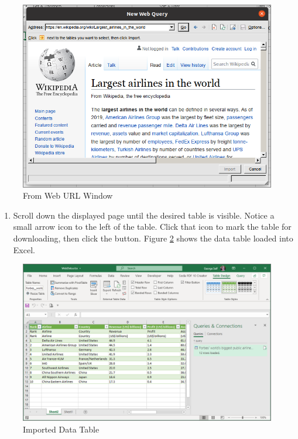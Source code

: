\begin{figure}[H]
	\centering
	\includegraphics[width=\maxwidth{.95\linewidth}]{gfx/ch07_fig02}
	\caption{From Web URL Window}
	\label{07:fig02}
\end{figure}



\begin{enumerate}[resume]
	\item Scroll down the displayed page until the desired table is visible. Notice a small arrow icon to the left of the table. Click that icon to mark the table for downloading, then click the  button. Figure \ref{07:fig04} shows the data table loaded into Excel.
\end{enumerate}

\begin{figure}[H]
	\centering
	\includegraphics[width=\maxwidth{.95\linewidth}]{gfx/ch07_fig04}
	\caption{Imported Data Table}
	\label{07:fig04}
\end{figure}

